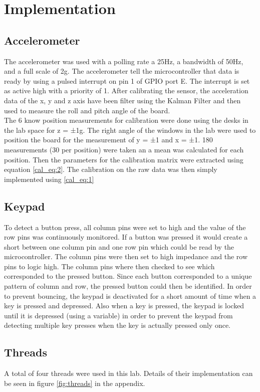 \documentclass[12pt]{article}
\begin{document}
\section{Implementation}
\subsection{Accelerometer}
The accelerometer was used with a polling rate a 25Hz, a bandwidth of 50Hz, and a full scale of 2g. The accelerometer tell the microcontroller that data is ready by using a pulsed interrupt on pin 1 of GPIO port E. The interrupt is set as active high with a priority of 1. After calibrating the sensor, the acceleration data of the x, y and z axis have been filter using the Kalman Filter and then used to measure the roll and pitch angle of the board. \\

The 6 know position measurements for calibration were done using the desks in the lab space for z = ±1g. The right angle of the windows in the lab were used to position the board for the measurement of y = ±1 and x = ±1. 180 measurements (30 per position) were taken an a mean was calculated for each position. Then the parameters for the calibration matrix were extracted using equation \ref{cal_eq:2}. The calibration on the raw data was then simply implemented using \ref{cal_eq:1}

\subsection{Keypad} \label{implementation:keypad}
To detect a button press, all column pins were set to high and the value of the row pins was continuously monitored. If a button was pressed it would create a short between one column pin and one row pin which could be read by the microcontroller. The column pins were then set to high impedance and the row pins to logic high. The column pins where then checked to see which corresponded to the pressed button. Since each button corresponded to a unique pattern of column and row, the pressed button could then be identified. In order to prevent bouncing, the keypad is deactivated for a short amount of time when a key is pressed and depressed. Also when a key is pressed, the keypad is locked until it is depressed (using a variable) in order to prevent the keypad from detecting multiple key presses when the key is actually pressed only once.

\subsection{Threads}
A total of four threads were used in this lab. Details of their implementation can be seen in figure \ref{fig:threads} in the appendix.
\end{document}

